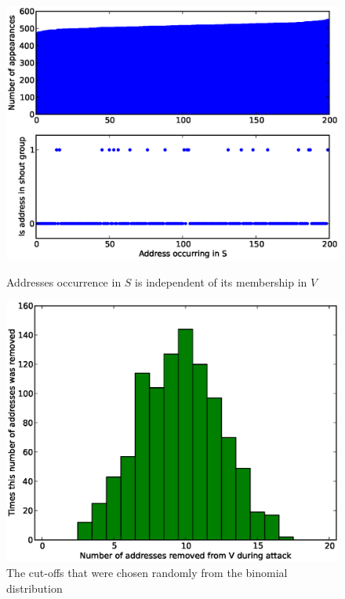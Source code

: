 \documentclass[ %
                    author={Luke Murray},
                supervisor={Dr. Simon Hollis},
                     title={Shadow Peer-to-Peer Networks},
                  subtitle={},
                    degree={MEng},
                      year={2013} ]{thesis}
\begin{document}
\begin{figure}[h]
    \centering
    \begin{minipage}[b]{0.4\linewidth}
        \centering
        \includegraphics[width=\linewidth]{diagrams/desired1.eps}
        \caption{Addresses occurrence in $S$ is independent of its membership in $V$}
        \label{threshold_attack_desired1}
    \end{minipage}
    \hspace{0.5cm}
    \begin{minipage}[b]{0.4\linewidth}
        \centering
        \includegraphics[width=\linewidth]{diagrams/desired2.eps}
        \caption{The cut-offs that were chosen randomly from the binomial distribution}
        \label{threshold_attack_desired2}
    \end{minipage}
\end{figure}
\end{document}
